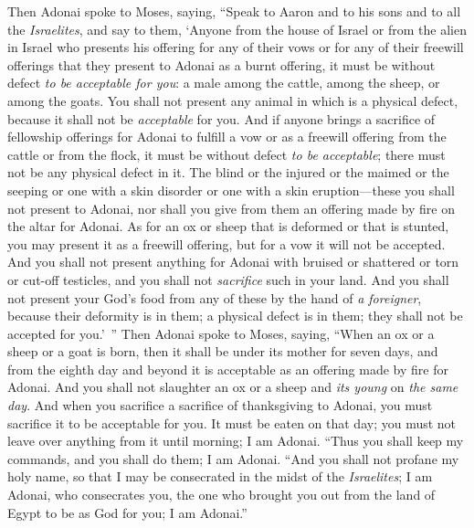 \begin{biblechapter}
 Then Adonai spoke to Moses, saying,
\verse “Speak to Aaron and to his sons and to all the \textit{Israelites}, and say to them, ‘Anyone from the house of Israel or from the alien in Israel who presents his offering for any of their vows or for any of their freewill offerings that they present to Adonai as a burnt offering,
\verse it must be without defect \textit{to be acceptable for you}: a male among the cattle, among the sheep, or among the goats.
\verse You shall not present any animal in which is a physical defect, because it shall not be \textit{acceptable} for you.
\verse And if anyone brings a sacrifice of fellowship offerings for Adonai to fulfill a vow or as a freewill offering from the cattle or from the flock, it must be without defect \textit{to be acceptable}; there must not be any physical defect in it.
\verse The blind or the injured or the maimed or the seeping or one with a skin disorder or one with a skin eruption—these you shall not present to Adonai, nor shall you give from them an offering made by fire on the altar for Adonai.
\verse As for an ox or sheep that is deformed or that is stunted, you may present it as a freewill offering, but for a vow it will not be accepted.
\verse And you shall not present anything for Adonai with bruised or shattered or torn or cut-off testicles, and you shall not \textit{sacrifice} such in your land.
\verse And you shall not present your God’s food from any of these by the hand of \textit{a foreigner}, because their deformity is in them; a physical defect is in them; they shall not be accepted for you.’ ”
\verse Then Adonai spoke to Moses, saying,
\verse “When an ox or a sheep or a goat is born, then it shall be under its mother for seven days, and from the eighth day and beyond it is acceptable as an offering made by fire for Adonai.
\verse And you shall not slaughter an ox or a sheep and \textit{its young} on \textit{the same day}.
\verse And when you sacrifice a sacrifice of thanksgiving to Adonai, you must sacrifice it to be acceptable for you.
\verse It must be eaten on that day; you must not leave over anything from it until morning; I am Adonai.
\verse “Thus you shall keep my commands, and you shall do them; I am Adonai.
\verse “And you shall not profane my holy name, so that I may be consecrated in the midst of the \textit{Israelites}; I am Adonai, who consecrates you,
\verse the one who brought you out from the land of Egypt to be as God for you; I am Adonai.”
\end{biblechapter}

